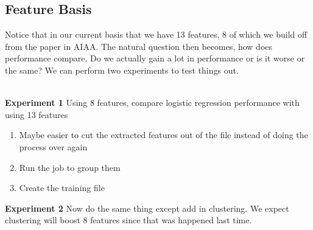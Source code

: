 \subsection{Feature Basis}

Notice that in our current basis that we have 13 features, 8 of which
we build off from the paper in AIAA. The natural question then
becomes, how does performance compare. Do we actually gain a lot in
performance or is it worse or the same? We can perform two experiments
to test things out.

~\\
\noindent \textbf{Experiment 1} Using 8 features, compare logistic
regression performance with using 13 features

\begin{enumerate}
\item Maybe easier to cut the extracted features out of the file
  instead of doing the process over again
\item Run the job to group them
\item Create the training file  
\end{enumerate}

\noindent \textbf{Experiment 2} Now do the same thing except add in
clustering. We expect clustering will boost 8 features since that was
happened last time.


